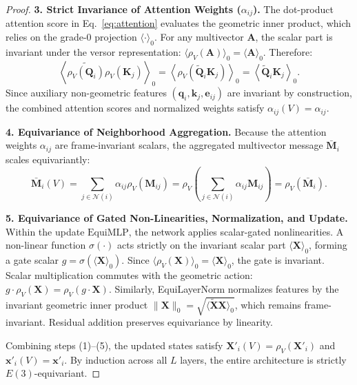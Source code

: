\documentclass[10pt]{article}
\begin{document}
\begin{proof}
\noindent
\textbf{3. Strict Invariance of Attention Weights ($\alpha_{ij}$).}
The dot-product attention score in Eq.~\ref{eq:attention} evaluates the geometric inner product, which relies on the grade-0 projection $\langle \cdot \rangle_0$. 
For any multivector $\mathbf{A}$, the scalar part is invariant under the versor representation: $\langle \rho_V(\mathbf{A}) \rangle_0 = \langle \mathbf{A} \rangle_0$. Therefore:
\begin{equation}
    \left\langle \widetilde{\rho_V(\mathbf{Q}_i)} \rho_V(\mathbf{K}_j) \right\rangle_0 = \left\langle \rho_V(\widetilde{\mathbf{Q}}_i \mathbf{K}_j) \right\rangle_0 = \left\langle \widetilde{\mathbf{Q}}_i \mathbf{K}_j \right\rangle_0.
\end{equation}
Since auxiliary non-geometric features $(\mathbf{q}_i, \mathbf{k}_j, \mathbf{e}_{ij})$ are invariant by construction, the combined attention scores and normalized weights satisfy $\alpha_{ij}(V) = \alpha_{ij}$.

\noindent
\textbf{4. Equivariance of Neighborhood Aggregation.}
Because the attention weights $\alpha_{ij}$ are frame-invariant scalars, the aggregated multivector message $\bar{\mathbf{M}}_i$ scales equivariantly:
\begin{equation}
    \bar{\mathbf{M}}_i(V) = \sum_{j \in \mathcal{N}(i)} \alpha_{ij} \rho_V(\mathbf{M}_{ij}) = \rho_V \left( \sum_{j \in \mathcal{N}(i)} \alpha_{ij} \mathbf{M}_{ij} \right) = \rho_V(\bar{\mathbf{M}}_i).
\end{equation}

\noindent
\textbf{5. Equivariance of Gated Non-Linearities, Normalization, and Update.}
Within the update $\mathrm{EquiMLP}$, the network applies scalar-gated nonlinearities. 
A non-linear function $\sigma(\cdot)$ acts strictly on the invariant scalar part $\langle \mathbf{X} \rangle_0$, forming a gate scalar $g = \sigma(\langle \mathbf{X} \rangle_0)$. Since $\langle \rho_V(\mathbf{X}) \rangle_0 = \langle \mathbf{X} \rangle_0$, the gate is invariant. Scalar multiplication commutes with the geometric action: $g \cdot \rho_V(\mathbf{X}) = \rho_V(g \cdot \mathbf{X})$.
Similarly, EquiLayerNorm normalizes features by the invariant geometric inner product $\|\mathbf{X}\|_0 = \sqrt{\langle \widetilde{\mathbf{X}} \mathbf{X} \rangle_0}$, which remains frame-invariant. 
Residual addition preserves equivariance by linearity.

Combining steps (1)–(5), the updated states satisfy $\mathbf{X}'_i(V) = \rho_V(\mathbf{X}'_i)$ and $\mathbf{x}'_i(V) = \mathbf{x}'_i$. By induction across all $L$ layers, the entire architecture is strictly $E(3)$-equivariant.
\end{proof}
\end{document}
